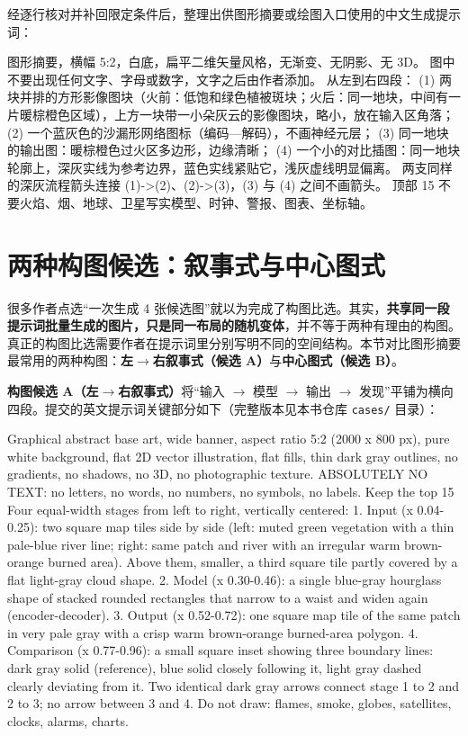 经逐行核对并补回限定条件后，整理出供图形摘要或绘图入口使用的中文生成提示词：

\begin{Prompt}
图形摘要，横幅 5:2，白底，扁平二维矢量风格，无渐变、无阴影、无 3D。
图中不要出现任何文字、字母或数字，文字之后由作者添加。
从左到右四段：
(1) 两块并排的方形影像图块（火前：低饱和绿色植被斑块；火后：同一地块，中间有一片暖棕橙色区域），上方一块带一小朵灰云的影像图块，略小，放在输入区角落；
(2) 一个蓝灰色的沙漏形网络图标（编码—解码），不画神经元层；
(3) 同一地块的输出图：暖棕橙色过火区多边形，边缘清晰；
(4) 一个小的对比插图：同一地块轮廓上，深灰实线为参考边界，蓝色实线紧贴它，浅灰虚线明显偏离。
两支同样的深灰流程箭头连接 (1)->(2)、(2)->(3)，(3) 与 (4) 之间不画箭头。
顶部 15%
不要火焰、烟、地球、卫星写实模型、时钟、警报、图表、坐标轴。
\end{Prompt}

\section{两种构图候选：叙事式与中心图式}

很多作者点选“一次生成 4 张候选图”就以为完成了构图比选。其实，\textbf{共享同一段提示词批量生成的图片，只是同一布局的随机变体}，并不等于两种有理由的构图。真正的构图比选需要作者在提示词里分别写明不同的空间结构。本节对比图形摘要最常用的两种构图：\textbf{左$\rightarrow$右叙事式（候选 A）}与\textbf{中心图式（候选 B）}。

\textbf{构图候选 A（左$\rightarrow$右叙事式）}将“输入 $\rightarrow$ 模型 $\rightarrow$ 输出 $\rightarrow$ 发现”平铺为横向四段。提交的英文提示词关键部分如下（完整版本见本书仓库 \texttt{cases/} 目录）：

\begin{Prompt}
Graphical abstract base art, wide banner, aspect ratio 5:2 (2000 x 800 px),
pure white background, flat 2D vector illustration, flat fills, thin dark gray
outlines, no gradients, no shadows, no 3D, no photographic texture.
ABSOLUTELY NO TEXT: no letters, no words, no numbers, no symbols, no labels.
Keep the top 15%
Four equal-width stages from left to right, vertically centered:
1. Input (x 0.04-0.25): two square map tiles side by side (left: muted green
   vegetation with a thin pale-blue river line; right: same patch and river with
   an irregular warm brown-orange burned area). Above them, smaller, a third
   square tile partly covered by a flat light-gray cloud shape.
2. Model (x 0.30-0.46): a single blue-gray hourglass shape of stacked rounded
   rectangles that narrow to a waist and widen again (encoder-decoder).
3. Output (x 0.52-0.72): one square map tile of the same patch in very pale gray
   with a crisp warm brown-orange burned-area polygon.
4. Comparison (x 0.77-0.96): a small square inset showing three boundary lines:
   dark gray solid (reference), blue solid closely following it, light gray
   dashed clearly deviating from it.
Two identical dark gray arrows connect stage 1 to 2 and 2 to 3; no arrow between
3 and 4. Do not draw: flames, smoke, globes, satellites, clocks, alarms, charts.
\end{Prompt}

